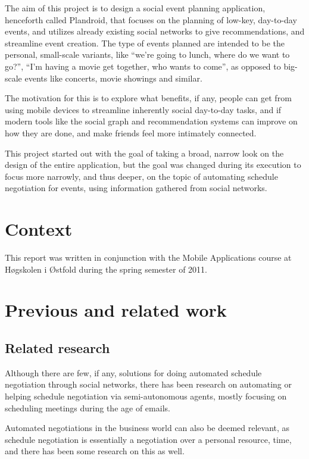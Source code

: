 \documentclass[a4paper,11pt]{report}
\begin{document}
The aim of this project is to design a social event planning application,
henceforth called Plandroid, that focuses on the planning of low-key, day-to-day
events, and utilizes already existing social networks to give recommendations,
and streamline event creation. The type of events planned are intended to be the
personal, small-scale variants, like ``we're going to lunch, where do we want to
go?'', ``I'm having a movie get together, who wants to come'', as opposed to
big-scale events like concerts, movie showings and similar.

The motivation for this is to explore what benefits, if any, people can get from
using mobile devices to streamline inherently social day-to-day tasks, and if
modern tools like the social graph and recommendation systems can improve on how
they are done, and make friends feel more intimately connected.

This project started out with the goal of taking a broad, narrow look on the
design of the entire application, but the goal was changed during its execution
to focus more narrowly, and thus deeper, on the topic of automating schedule
negotiation for events, using information gathered from social networks.

\section{Context}
This report was written in conjunction with the Mobile Applications course at
H\o{}gskolen i \O{}stfold\cite{site:mobapp} during the spring semester of 2011.

\section{Previous and related work}

\subsection{Related research}

Although there are few, if any, solutions for doing automated schedule
negotiation through social networks, there has been research on automating or
helping schedule negotiation via semi-autonomous
agents\cite{haynes97:_autom_meetin_sched_system,sen97:_devel,benhassine07},
mostly focusing on scheduling meetings during the age of emails.

Automated negotiations in the business world can also be deemed relevant, as
schedule negotiation is essentially a negotiation over a personal resource,
time, and there has been some research on this as
well\cite{Beam97automatednegotiations:}.
\end{document}
